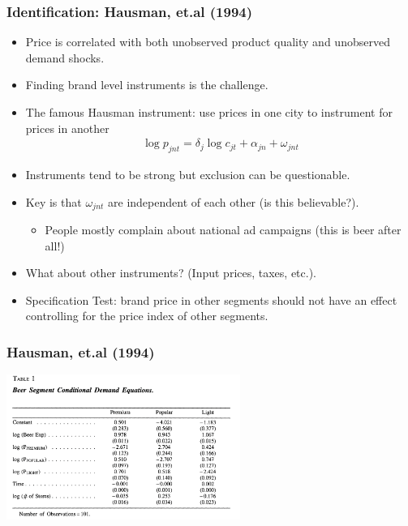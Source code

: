 \documentclass[xcolor=pdftex,dvipsnames,table,mathserif,aspectratio=169]{beamer}
\begin{document}
\begin{frame}
\frametitle{Identification: Hausman, et.al (1994)}
\small
\begin{itemize}
\item Price is correlated with both \alert{unobserved product quality} and \alert{unobserved demand shocks}.
\item Finding brand level instruments is the challenge.
\item The famous \alert{Hausman instrument}: use prices in one city to instrument for prices in another
\begin{eqnarray*}
\log p_{jnt} = \delta_j \log c_{jt} + \alpha_{jn} + \omega_{jnt}
\end{eqnarray*}
\item Instruments tend to be \alert{strong} but \alert{exclusion} can be questionable.
\item Key is that $\omega_{jnt}$ are independent of each other (is this believable?).
\begin{itemize}
\item People mostly complain about national ad campaigns (this is beer after all!)
\end{itemize}
\item What about other instruments? (Input prices, taxes, etc.).
\item Specification Test: brand price in other segments should not have an effect controlling for the price index of other segments.
\end{itemize}
\end{frame}


\begin{frame}
\frametitle{Hausman, et.al (1994)}
\begin{center}
\includegraphics[width=3in]{resources/beer1.png}
\end{center}
\end{frame}
\end{document}
